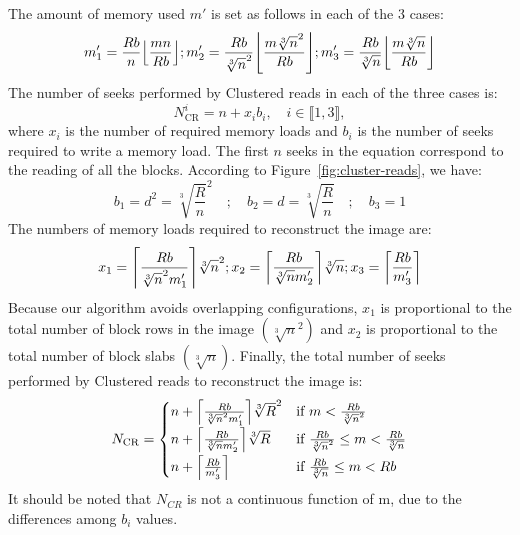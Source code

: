 \documentclass[10pt, conference, compsocconf]{IEEEtran}
\DeclarePairedDelimiter{\ceil}{\lceil}{\rceil}
\DeclarePairedDelimiter{\floor}{\lfloor}{\rfloor}
\begin{document}
The amount of memory used $m'$ is set as follows in each of the 3 cases:
\begin{equation*}
  m_1' = \frac{Rb}{n}\floor*{\frac{mn}{Rb}};
  m_2' = \frac{Rb}{\sqrt[3]{n}^2}\floor*{\frac{m\sqrt[3]{n}^2}{Rb}};
  m_3' = \frac{Rb}{\sqrt[3]{n}}\floor*{\frac{m\sqrt[3]{n}}{Rb}}
\end{equation*}
The number of seeks performed by Clustered reads in each of the three cases is:
\begin{equation*}
  N^i_{\mathrm{CR}} = n + x_ib_i, \quad i \in \llbracket 1, 3\rrbracket,
\end{equation*}
where $x_i$ is the number of required memory loads and $b_i$ is the
number of seeks required to write a memory load. The first $n$ seeks
in the equation correspond to the reading of all the blocks. According
to Figure~\ref{fig:cluster-reads}, we have:
\begin{equation*}
  b_1=d^2=\sqrt[3]{\frac{R}{n}}^2 \quad ; \quad b_2=d=\sqrt[3]{\frac{R}{n}} \quad ; \quad b_3=1
\end{equation*}
The
numbers of memory loads required to reconstruct the image are:
\begin{equation*}
  x_1 = \ceil*{\frac{Rb}{\sqrt[3]{n}^2m_1'}}\sqrt[3]{n}^2;
  x_2 = \ceil*{\frac{Rb}{\sqrt[3]{n}m_2'}}\sqrt[3]{n};
  x_3 = \ceil*{\frac{Rb}{m_3'}}
\end{equation*}
Because our algorithm avoids overlapping configurations, $x_1$ is
proportional to the total number of block rows in the image
$\left( \sqrt[3]{n}^2 \right)$ and $x_2$ is proportional to the total number of
block slabs $\left( \sqrt[3]{n} \right)$.
Finally, the total number of seeks
performed by Clustered reads to reconstruct the image is:
\begin{equation}
N_\mathrm{CR} =
\begin{cases}
  n + \ceil*{\frac{Rb}{\sqrt[3]{n}^2m_1'}}\sqrt[3]{R}^2     & \text{if } m < \frac{Rb}{\sqrt[3]{n}^2}\\[0.4em]
  n + \ceil*{\frac{Rb}{\sqrt[3]{n}m_2'}}\sqrt[3]{R}        & \text{if } \frac{Rb}{\sqrt[3]{n}^2} \leq m < \frac{Rb}{\sqrt[3]{n}}\\[0.4em]
  n + \ceil*{\frac{Rb}{m_3'}}                              & \text{if } \frac{Rb}{\sqrt[3]{n}} \leq m < Rb
\end{cases} \label{eq:seeks-cluster-reads-1}
\end{equation}
It should be noted that $N_{CR}$ is not a continuous function of m,
due to the differences among $b_i$ values.
\end{document}
